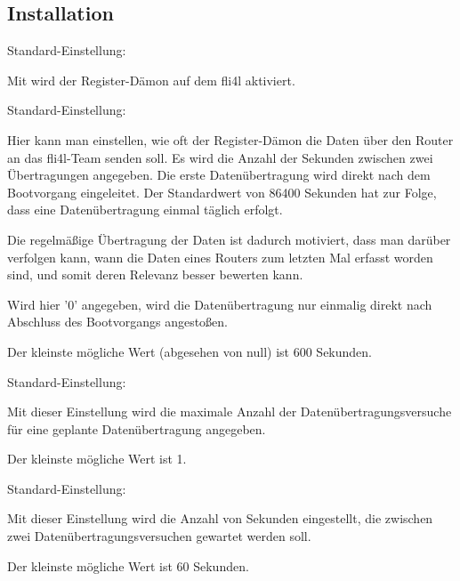 \subsection{Installation}

\begin{description}


Standard-Einstellung: 

Mit  wird der Register-Dämon auf dem fli4l aktiviert.


Standard-Einstellung: 

Hier kann man einstellen, wie oft der Register-Dämon die Daten über den Router
an das fli4l-Team senden soll. Es wird die Anzahl der Sekunden zwischen zwei
Übertragungen angegeben. Die erste Datenübertragung wird direkt nach dem
Bootvorgang eingeleitet. Der Standardwert von 86400 Sekunden hat zur Folge,
dass eine Datenübertragung einmal täglich erfolgt.

Die regelmäßige Übertragung der Daten ist dadurch motiviert, dass man darüber
verfolgen kann, wann die Daten eines Routers zum letzten Mal erfasst worden
sind, und somit deren Relevanz besser bewerten kann.

Wird hier '0' angegeben, wird die Datenübertragung nur einmalig direkt nach
Abschluss des Bootvorgangs angestoßen.

Der kleinste mögliche Wert (abgesehen von null) ist 600 Sekunden.


Standard-Einstellung: 

Mit dieser Einstellung wird die maximale Anzahl der Datenübertragungsversuche
für eine geplante Datenübertragung angegeben.

Der kleinste mögliche Wert ist 1.


Standard-Einstellung: 

Mit dieser Einstellung wird die Anzahl von Sekunden eingestellt, die zwischen
zwei Datenübertragungsversuchen gewartet werden soll.

Der kleinste mögliche Wert ist 60 Sekunden.

\end{description}
